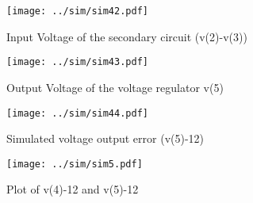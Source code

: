 \begin{figure}[ht!] \centering
\texttt{[image: ../sim/sim42.pdf]}
\caption{Input Voltage of the secondary circuit (v(2)-v(3))} 
\label{fig:sim42}
\end{figure}

\begin{figure}[ht!] \centering
\texttt{[image: ../sim/sim43.pdf]}
\caption{Output Voltage of the voltage regulator v(5)} 
\label{fig:sim43}
\end{figure}

\begin{figure}[ht!] \centering
\texttt{[image: ../sim/sim44.pdf]}
\caption{Simulated voltage output error (v(5)-12)} 
\label{fig:sim44}
\end{figure}

\begin{figure}[ht!] \centering
\texttt{[image: ../sim/sim5.pdf]}
\caption{Plot of v(4)-12 and v(5)-12} 
\label{fig:sim5}
\end{figure}



